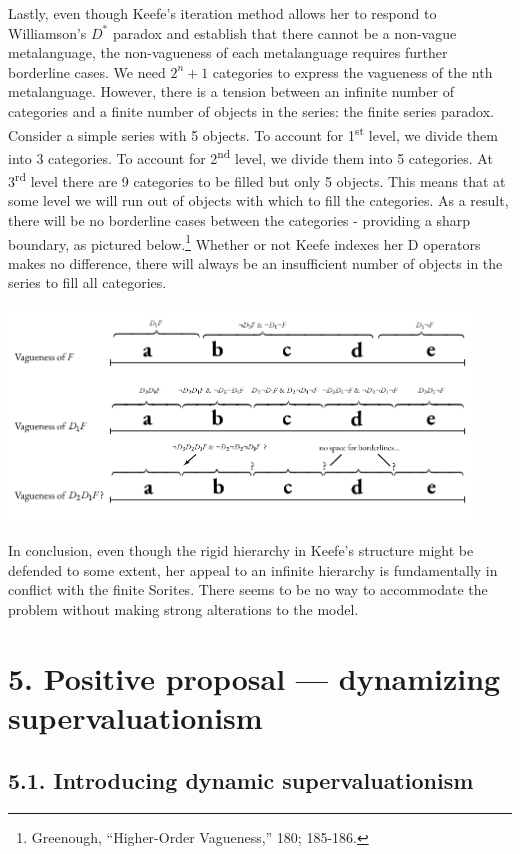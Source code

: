 Lastly, even though Keefe's iteration method allows her to respond to
Williamson's $D^*$ paradox and establish that there cannot be a non-vague
metalanguage, the non-vagueness of each metalanguage requires further
borderline cases. We need \(2^{n} + 1\) categories to express the
vagueness of the nth metalanguage. However, there is a tension between
an infinite number of categories and a finite number of objects in the
series: the finite series paradox. Consider a simple series with 5
objects. To account for 1\textsuperscript{st} level, we divide them into
3 categories. To account for 2\textsuperscript{nd} level, we divide them
into 5 categories. At 3\textsuperscript{rd} level there are 9 categories
to be filled but only 5 objects. This means that at some level we will
run out of objects with which to fill the categories. As a result, there
will be no borderline cases between the categories - providing a sharp
boundary, as pictured below.\footnote{Greenough, ``Higher-Order
  Vagueness,'' 180; 185-186.} Whether or not Keefe indexes her D
operators makes no difference, there will always be an insufficient
number of objects in the series to fill all categories.
\begin{center}
\includegraphics[width=0.925\textwidth]{papers/figures/2-2.pdf}
\end{center}
In conclusion, even though the rigid hierarchy in Keefe's structure
might be defended to some extent, her appeal to an infinite hierarchy is
fundamentally in conflict with the finite Sorites. There seems to be no
way to accommodate the problem without making strong alterations to the
model.

\section{5. Positive proposal --- dynamizing supervaluationism}

\subsection{5.1. Introducing dynamic supervaluationism}

